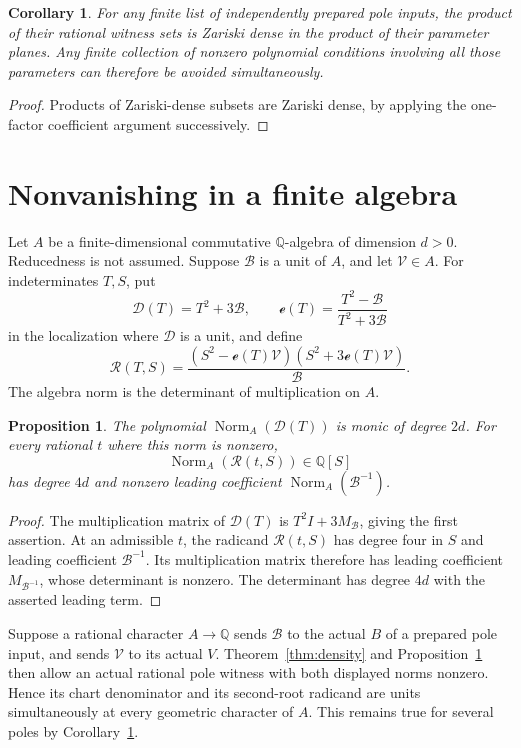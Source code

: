 \documentclass[11pt,a4paper]{article}
\newtheorem{proposition}[theorem]{Proposition}
\newtheorem{corollary}[theorem]{Corollary}
\newcommand{\Q}{\mathbb Q}\newcommand{\Z}{\mathbb Z}
\DeclareMathOperator{\Norm}{Norm}
\begin{document}
\begin{corollary}\label{cor:several}
For any finite list of independently prepared pole inputs, the
product of their rational witness sets is Zariski dense in the
product of their parameter planes.  Any finite collection of
nonzero polynomial conditions involving all those parameters
can therefore be avoided simultaneously.
\end{corollary}
\begin{proof}
Products of Zariski-dense subsets are Zariski dense, by applying
the one-factor coefficient argument successively.
\end{proof}

\section{Nonvanishing in a finite algebra}

Let $A$ be a finite-dimensional commutative $\Q$-algebra of dimension
$d>0$.  Reducedness is not assumed.  Suppose $\mathcal B$ is a
unit of $A$, and let $\mathcal V\in A$.  For indeterminates $T,S$,
put
\[
 \mathcal D(T)=T^2+3\mathcal B,\qquad
 \mathcal e(T)=\frac{T^2-\mathcal B}{T^2+3\mathcal B}
\]
in the localization where $\mathcal D$ is a unit, and define
\[
 \mathcal R(T,S)=
 \frac{(S^2-\mathcal e(T)\mathcal V)
            (S^2+3\mathcal e(T)\mathcal V)}{\mathcal B}.
\]
The algebra norm is the determinant of multiplication on $A$.

\begin{proposition}\label{prop:radicands}
The polynomial $\Norm_A(\mathcal D(T))$ is monic of degree $2d$.
For every rational $t$ where this norm is nonzero,
\[
               \Norm_A(\mathcal R(t,S))\in\Q[S]
\]
has degree $4d$ and nonzero leading coefficient
$\Norm_A(\mathcal B^{-1})$.
\end{proposition}
\begin{proof}
The multiplication matrix of $\mathcal D(T)$ is
$T^2I+3M_{\mathcal B}$, giving the first assertion.
At an admissible $t$, the radicand $\mathcal R(t,S)$ has degree
four in $S$ and leading coefficient $\mathcal B^{-1}$.
Its multiplication matrix therefore has leading coefficient
$M_{\mathcal B^{-1}}$, whose determinant is nonzero.
The determinant has degree $4d$ with the asserted leading term.
\end{proof}

Suppose a rational character $A\to\Q$ sends $\mathcal B$ to
the actual $B$ of a prepared pole input, and sends $\mathcal V$
to its actual $V$.  Theorem~\ref{thm:density} and
Proposition~\ref{prop:radicands} then allow an actual rational
pole witness with both displayed norms nonzero.  Hence its chart
denominator and its second-root radicand are units simultaneously
at every geometric character of $A$.  This remains true for several
poles by Corollary~\ref{cor:several}.
\end{document}
